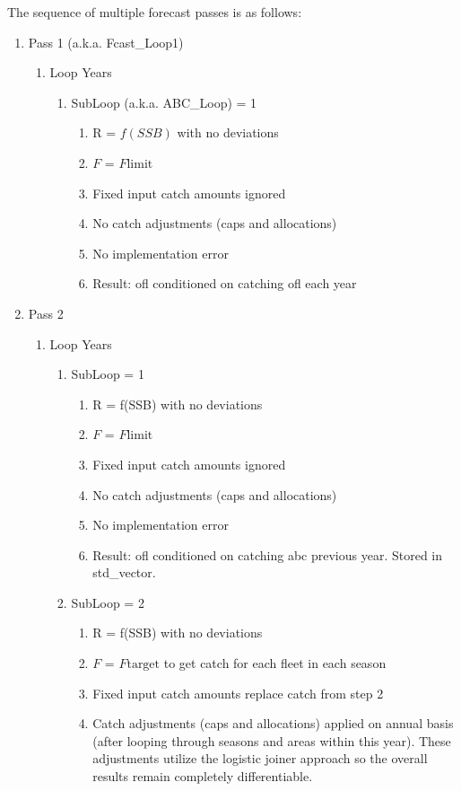 The sequence of multiple forecast passes is as follows:
\begin{enumerate}
	\item Pass 1 (a.k.a. Fcast\_Loop1)
	\begin{enumerate}
		\item Loop Years
		\begin{enumerate}
			\item SubLoop (a.k.a. ABC\_Loop) = 1
			\begin{enumerate}
				\item R = $f(SSB)$ with no deviations
				\item $F$ = $F\text{limit}$
				\item Fixed input catch amounts ignored
				\item No catch adjustments (caps and allocations)
				\item No implementation error
				\item Result: \gls{ofl} conditioned on catching \gls{ofl} each year
			\end{enumerate}
		\end{enumerate}
	\end{enumerate}
	\item Pass 2
	\begin{enumerate}
		\item Loop Years
		\begin{enumerate}
			\item SubLoop = 1
			\begin{enumerate}
				\item R = f(SSB) with no deviations
				\item $F$ = $F\text{limit}$
				\item Fixed input catch amounts ignored
				\item No catch adjustments (caps and allocations)
				\item No implementation error
				\item Result: \gls{ofl} conditioned on catching \gls{abc} previous year. Stored in std\_vector.
			\end{enumerate}
			\item SubLoop = 2
			\begin{enumerate}
				\item R = f(SSB) with no deviations
				\item $F$ = $F\text{target}$ to get catch for each fleet in each season
				\item Fixed input catch amounts replace catch from step 2
				\item Catch adjustments (caps and allocations) applied on annual basis (after looping through seasons and areas within this year). These adjustments utilize the logistic joiner approach so the overall results remain completely differentiable.

\end{enumerate}
\end{enumerate}
\end{enumerate}
\end{enumerate}
